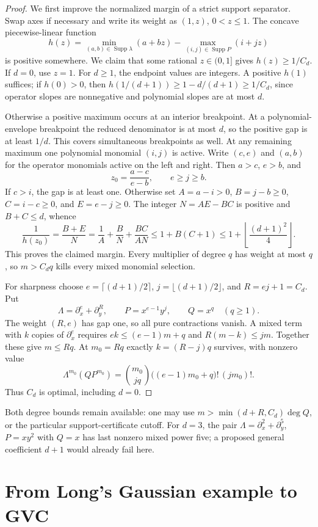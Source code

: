 \documentclass[11pt]{article}
\newcommand{\Supp}{\operatorname{Supp}}
\begin{document}
\begin{proof}
We first improve the normalized margin of a strict support separator.
Swap axes if necessary and write its weight as $(1,z)$, $0<z\le1$.
The concave piecewise-linear function
\[
 h(z)=\min_{(a,b)\in\Supp\lambda}(a+bz)
       -\max_{(i,j)\in\Supp P}(i+jz)
\]
is positive somewhere. We claim that some rational $z\in(0,1]$ gives
$h(z)\ge1/C_d$. If $d=0$, use $z=1$. For $d\ge1$, the endpoint values
are integers. A positive $h(1)$ suffices; if $h(0)>0$, then
$h(1/(d+1))\ge1-d/(d+1)\ge1/C_d$, since operator slopes are nonnegative
and polynomial slopes are at most $d$.

Otherwise a positive maximum occurs at an interior breakpoint. At a
polynomial-envelope breakpoint the reduced denominator is at most $d$,
so the positive gap is at least $1/d$. This covers simultaneous
breakpoints as well. At any remaining maximum one polynomial monomial
$(i,j)$ is active. Write $(c,e)$ and $(a,b)$ for the operator monomials
active on the left and right. Then $a>c$, $e>b$, and
\[
 z_0=\frac{a-c}{e-b},\qquad e\ge j\ge b.
\]
If $c>i$, the gap is at least one. Otherwise set
$A=a-i>0$, $B=j-b\ge0$, $C=i-c\ge0$, and $E=e-j\ge0$.
The integer $N=AE-BC$ is positive and $B+C\le d$, whence
\[
 \frac1{h(z_0)}=\frac{B+E}{N}
 =\frac1A+\frac B N+\frac{BC}{AN}
 \le1+B(C+1)\le1+\left\lfloor\frac{(d+1)^2}{4}\right\rfloor.
\]
This proves the claimed margin. Every multiplier of degree $q$ has weight
at most $q$, so $m>C_dq$ kills every mixed monomial selection.

For sharpness choose $e=\lceil(d+1)/2\rceil$, $j=\lfloor(d+1)/2\rfloor$,
and $R=ej+1=C_d$. Put
\[
 \Lambda=\partial_x^e+\partial_y^R,\qquad P=x^{e-1}y^j,
 \qquad Q=x^q\quad(q\ge1).
\]
The weight $(R,e)$ has gap one, so all pure contractions vanish.
A mixed term with $k$ copies of $\partial_x^e$ requires
$ek\le(e-1)m+q$ and $R(m-k)\le jm$. Together these give $m\le Rq$.
At $m_0=Rq$ exactly $k=(R-j)q$ survives, with nonzero value
\[
 \Lambda^{m_0}(QP^{m_0})
 =\binom{m_0}{jq}\bigl((e-1)m_0+q\bigr)!\,(jm_0)!.
\]
Thus $C_d$ is optimal, including $d=0$.
\end{proof}

Both degree bounds remain available: one may use
$m>\min(d+R,C_d)\deg Q$, or the particular support-certificate cutoff.
For $d=3$, the pair $\Lambda=\partial_x^2+\partial_y^5$, $P=xy^2$
with $Q=x$ has last nonzero mixed power five; a proposed general
coefficient $d+1$ would already fail here.

\section{From Long's Gaussian example to GVC}
\end{document}
